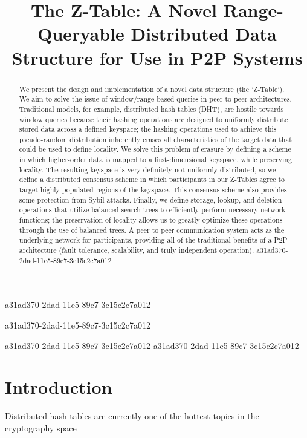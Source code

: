 \documentclass[12pt]{article}
\title{The Z-Table: A Novel Range-Queryable Distributed Data Structure for Use in P2P Systems}
\begin{document}
a31ad370-2dad-11e5-89c7-3c15c2c7a012\maketitle

a31ad370-2dad-11e5-89c7-3c15c2c7a012\begin{abstract}
We present the design and implementation of a novel data structure (the 'Z-Table'). We aim to solve the issue of window/range-based queries in peer to peer architectures. Traditional models, for example,  distributed hash tables (DHT), are hostile towards window queries because their hashing operations are designed to uniformly distribute stored data across a defined keyspace; the hashing operations used to achieve this pseudo-random distribution inherently erases all characteristics of the target data that could be used to define locality. We solve this problem of erasure by defining a scheme in which higher-order data is mapped to a first-dimensional keyspace, while preserving locality. The resulting keyspace is very definitely not uniformly distributed, so we define a distributed consensus scheme in which participants in our Z-Tables agree to target highly populated regions of the keyspace. This consensus scheme also provides some protection from Sybil attacks. Finally, we define storage, lookup, and deletion operations that utilize balanced search trees to efficiently perform necessary network functions; the preservation of locality allows us to greatly optimize these operations through the use of balanced trees. A peer to peer communication system acts as the underlying network for participants, providing all of the traditional benefits of a P2P architecture (fault tolerance, scalability, and truly independent operation).
a31ad370-2dad-11e5-89c7-3c15c2c7a012\end{abstract}

a31ad370-2dad-11e5-89c7-3c15c2c7a012
a31ad370-2dad-11e5-89c7-3c15c2c7a012\newpage
\section{Introduction}
Distributed hash tables are currently one of the hottest topics in the cryptography space~\cite{Stoica:2001dj,Rowstron:2001ea,Ratnasamy:2001wn}

\printbibliography
\end{document}
